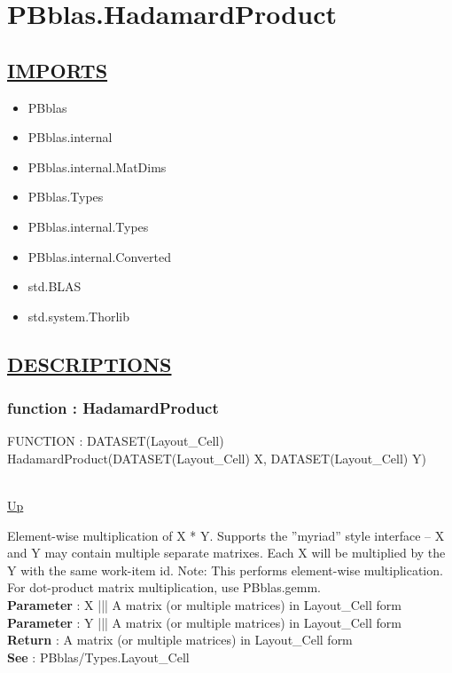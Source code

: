 \chapter*{PBblas.HadamardProduct}
\hypertarget{PBblas.HadamardProduct}{}

\section*{\underline{IMPORTS}}
\begin{itemize}
\item PBblas
\item PBblas.internal
\item PBblas.internal.MatDims
\item PBblas.Types
\item PBblas.internal.Types
\item PBblas.internal.Converted
\item std.BLAS
\item std.system.Thorlib
\end{itemize}

\section*{\underline{DESCRIPTIONS}}
\subsection*{function : HadamardProduct}
\hypertarget{ecldoc:pbblas.hadamardproduct}{FUNCTION : DATASET(Layout\_Cell) HadamardProduct(DATASET(Layout\_Cell) X, DATASET(Layout\_Cell) Y)} \\
\hyperlink{ecldoc:}{Up} \\
\par
Element-wise multiplication of X * Y. Supports the ''myriad'' style interface -- X and Y may contain multiple separate matrixes. Each X will be multiplied by the Y with the same work-item id. Note: This performs element-wise multiplication. For dot-product matrix multiplication, use PBblas.gemm. \\
\textbf{Parameter} : X ||| A matrix (or multiple matrices) in Layout\_Cell form \\
\textbf{Parameter} : Y ||| A matrix (or multiple matrices) in Layout\_Cell form \\
\textbf{Return} : A matrix (or multiple matrices) in Layout\_Cell form \\
\textbf{See} : PBblas/Types.Layout\_Cell \\
